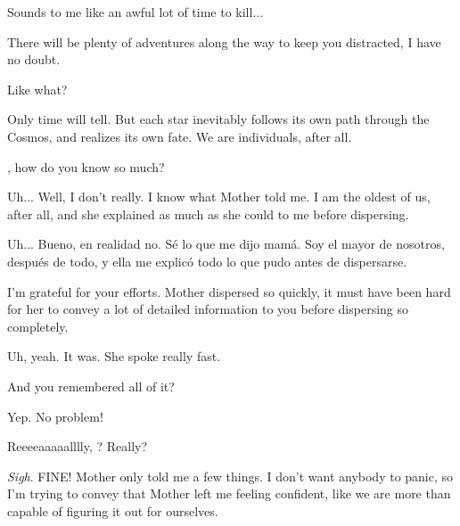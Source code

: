 \documentclass[main.tex]{subfiles}
\begin{document}
\par \Celaeno Sounds to me like an awful lot of time to kill...

\par \Maia There will be plenty of adventures along the way to keep you distracted, I have no doubt.

\par \Sterope  Like what?  

\par \Maia Only time will tell.  But each star inevitably follows its own path through the Cosmos, and realizes its own fate.  We are individuals, after all.

\par \Sterope \rmmaia, how do you know so much?

\par \Maia Uh... Well, I don't really. I know what Mother told me.  I am the oldest of us, after all, and she explained as much as she could to me before dispersing.  

\par \spanish Uh... Bueno, en realidad no.  S\'e lo que me dijo mam\'a.  Soy el mayor de nosotros, despu\'es de todo, y ella me explic\'o todo lo que pudo antes de dispersarse.

\par \Sterope I'm grateful for your efforts.  Mother dispersed so quickly, it must have been hard for her to convey a lot of detailed information to you before dispersing so completely.

\par \Maia Uh, yeah.  It was.  She spoke really fast.

\par \Sterope And you remembered all of it?

\par \Maia Yep.  No problem!  

\par \Sterope Reeeeaaaaalllly, \rmmaia?  Really?

\par \Maia \textit{Sigh}.  FINE!  Mother only told me a few things.  I don't want anybody to panic, so I'm trying to convey that Mother left me feeling confident, like we are more than capable of figuring it out for ourselves.  
\end{document}
